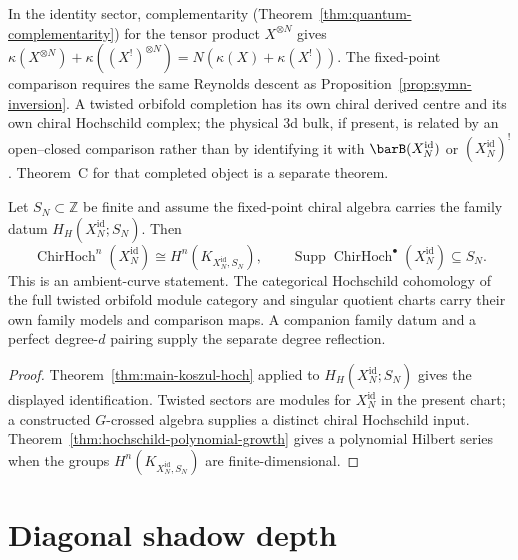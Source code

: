 \begin{remark}
\label{rem:symn-complementarity}
In the identity sector, complementarity
(Theorem~\ref{thm:quantum-complementarity}) for the tensor product
$X^{\otimes N}$ gives
$\kappa(X^{\otimes N}) + \kappa((X^!)^{\otimes N}) =
N(\kappa(X) + \kappa(X^!))$. The fixed-point comparison requires the
same Reynolds descent as Proposition~\ref{prop:symn-inversion}. A
twisted orbifold completion has its own chiral derived centre and
its own chiral Hochschild complex; the physical $3$d bulk, if
present, is related by an open--closed comparison rather than by
identifying it with $\barB(X_N^{\mathrm{id}})$ or
$(X_N^{\mathrm{id}})^!$. Theorem~C for that completed object is a
separate theorem.
\end{remark}

\begin{proposition}\label{prop:symn-hochschild}
Let $S_N\subset\mathbb Z$ be finite and assume the fixed-point chiral
algebra carries the family datum $H_H(X_N^{\mathrm{id}};S_N)$.  Then
\[
 \operatorname{ChirHoch}^n(X_N^{\mathrm{id}})
 \cong H^n(K_{X_N^{\mathrm{id}},S_N}),
 \qquad
 \operatorname{Supp}\operatorname{ChirHoch}^\bullet
 (X_N^{\mathrm{id}})\subseteq S_N.
\]
This is an ambient-curve statement.  The categorical Hochschild
cohomology of the full twisted orbifold module category and singular
quotient charts carry their own family models and comparison maps.
A companion family datum and a perfect degree-$d$ pairing supply the
separate degree reflection.
\end{proposition}

\begin{proof}
Theorem~\ref{thm:main-koszul-hoch} applied to
$H_H(X_N^{\mathrm{id}};S_N)$ gives the displayed identification.
Twisted sectors are modules for $X_N^{\mathrm{id}}$ in the present
chart; a constructed $G$-crossed algebra supplies a distinct chiral
Hochschild input.  Theorem~\ref{thm:hochschild-polynomial-growth}
gives a polynomial Hilbert series when the groups
$H^n(K_{X_N^{\mathrm{id}},S_N})$ are finite-dimensional.
\end{proof}



\section{Diagonal shadow depth}\label{sec:symn-shadow-depth}

